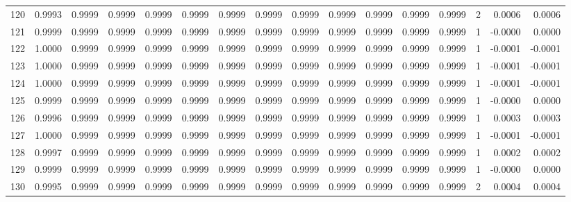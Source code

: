 \begin{tabular}{lrrrrrrrrrrrrrrr}
120 &      0.9993 &  0.9999 &  0.9999 &  0.9999 &  0.9999 &  0.9999 &  0.9999 &  0.9999 &  0.9999 &  0.9999 &   0.9999 &     0.9999 &      2 &                    0.0006 &                     0.0006 \\
121 &      0.9999 &  0.9999 &  0.9999 &  0.9999 &  0.9999 &  0.9999 &  0.9999 &  0.9999 &  0.9999 &  0.9999 &   0.9999 &     0.9999 &      1 &                   -0.0000 &                     0.0000 \\
122 &      1.0000 &  0.9999 &  0.9999 &  0.9999 &  0.9999 &  0.9999 &  0.9999 &  0.9999 &  0.9999 &  0.9999 &   0.9999 &     0.9999 &      1 &                   -0.0001 &                    -0.0001 \\
123 &      1.0000 &  0.9999 &  0.9999 &  0.9999 &  0.9999 &  0.9999 &  0.9999 &  0.9999 &  0.9999 &  0.9999 &   0.9999 &     0.9999 &      1 &                   -0.0001 &                    -0.0001 \\
124 &      1.0000 &  0.9999 &  0.9999 &  0.9999 &  0.9999 &  0.9999 &  0.9999 &  0.9999 &  0.9999 &  0.9999 &   0.9999 &     0.9999 &      1 &                   -0.0001 &                    -0.0001 \\
125 &      0.9999 &  0.9999 &  0.9999 &  0.9999 &  0.9999 &  0.9999 &  0.9999 &  0.9999 &  0.9999 &  0.9999 &   0.9999 &     0.9999 &      1 &                   -0.0000 &                     0.0000 \\
126 &      0.9996 &  0.9999 &  0.9999 &  0.9999 &  0.9999 &  0.9999 &  0.9999 &  0.9999 &  0.9999 &  0.9999 &   0.9999 &     0.9999 &      1 &                    0.0003 &                     0.0003 \\
127 &      1.0000 &  0.9999 &  0.9999 &  0.9999 &  0.9999 &  0.9999 &  0.9999 &  0.9999 &  0.9999 &  0.9999 &   0.9999 &     0.9999 &      1 &                   -0.0001 &                    -0.0001 \\
128 &      0.9997 &  0.9999 &  0.9999 &  0.9999 &  0.9999 &  0.9999 &  0.9999 &  0.9999 &  0.9999 &  0.9999 &   0.9999 &     0.9999 &      1 &                    0.0002 &                     0.0002 \\
129 &      0.9999 &  0.9999 &  0.9999 &  0.9999 &  0.9999 &  0.9999 &  0.9999 &  0.9999 &  0.9999 &  0.9999 &   0.9999 &     0.9999 &      1 &                   -0.0000 &                     0.0000 \\
130 &      0.9995 &  0.9999 &  0.9999 &  0.9999 &  0.9999 &  0.9999 &  0.9999 &  0.9999 &  0.9999 &  0.9999 &   0.9999 &     0.9999 &      2 &                    0.0004 &                     0.0004 \\

\end{tabular}

